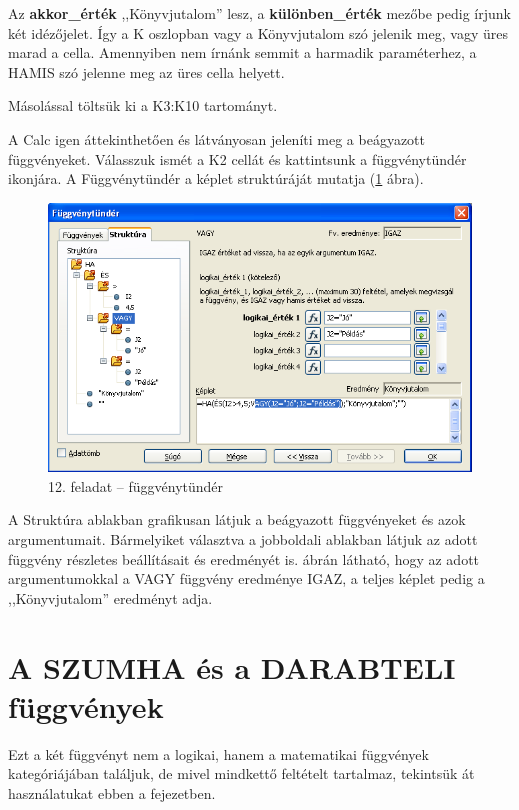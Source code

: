 Az \textbf{akkor\_érték} ,,Könyvjutalom'' lesz, a
\textbf{különben\_érték} mezőbe pedig írjunk két idézőjelet. 
Így a K oszlopban vagy a Könyvjutalom szó jelenik
meg, vagy üres marad a cella. Amennyiben nem írnánk semmit a
harmadik paraméterhez, a HAMIS szó jelenne meg az üres cella
helyett.

Másolással töltsük ki a K3:K10 tartományt.

A Calc igen áttekinthetően és látványosan jeleníti meg a
beágyazott függvényeket. Válasszuk ismét a K2 cellát és
kattintsunk a függvénytündér ikonjára. A
Függvénytündér a képlet struktúráját mutatja
(\ref{12-feladatFüggvénytündér} ábra).

\begin{figure}[!h]
\begin{center}
\includegraphics[width=13.999cm]{oocalcv2-img72.png}
\caption{12. feladat --  függvénytündér}\label{12-feladatFüggvénytündér}
\end{center}
\end{figure}

A Struktúra ablakban grafikusan látjuk a beágyazott
függvényeket és azok argumentumait.  Bármelyiket választva a
jobboldali ablakban látjuk az adott függvény részletes
beállításait és   eredményét is.  ábrán
látható, hogy az adott argumentumokkal a VAGY függvény
eredménye IGAZ, a teljes képlet pedig a
,,Könyvjutalom'' eredményt
adja.

\section[A SZUMHA és a DARABTELI függvények]{A SZUMHA és a DARABTELI függvények}

Ezt a két függvényt nem a logikai, hanem a matematikai
függvények kategóriájában találjuk, de mivel mindkettő
feltételt tartalmaz, tekintsük át használatukat ebben a
fejezetben.

